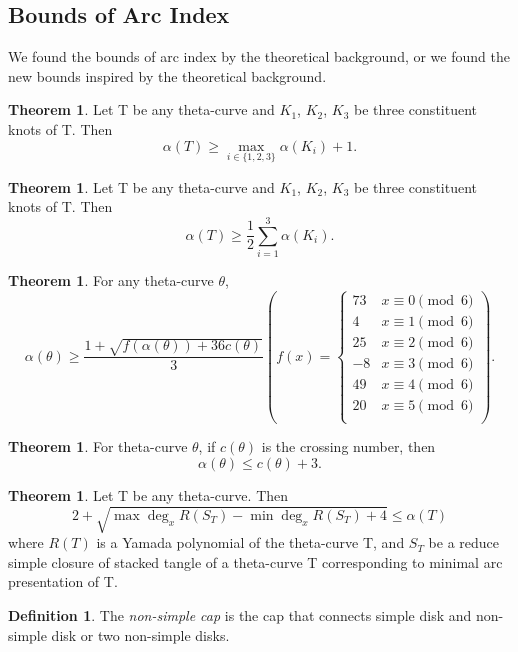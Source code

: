 \documentclass{article}
\theoremstyle{definition}
\newtheorem{defn}[thm]{Definition}
\theoremstyle{theorem}
\newtheorem{theorem}[thm]{Theorem}
\theoremstyle{proposition}
\theoremstyle{corollary}
\begin{document}
\subsection{Bounds of Arc Index}
We found the bounds of arc index by the theoretical background, or we found the new bounds inspired by the theoretical background.


\begin{theorem}
Let T be any theta-curve and $K_1$, $K_2$, $K_3$ be three constituent knots of T. Then $$\alpha(T) \geq \underset{i \in \{1,2,3\}}\max \alpha(K_i) + 1.$$
\end{theorem}

\begin{theorem}
Let T be any theta-curve and $K_1$, $K_2$, $K_3$ be three constituent knots of T. Then $$\alpha(T) \geq \frac{1}{2}\sum_{i=1}^3\alpha(K_i).$$
\end{theorem}

\begin{theorem}
For any theta-curve $\theta$, $$\alpha(\theta)\geq\frac{1+\sqrt{f(\alpha(\theta))+36c(\theta)}}{3} \left(f(x) = \begin{cases} 
		73 & x \equiv 0 \pmod 6\\ 
		4 & x \equiv 1 \pmod 6\\ 
		25 & x \equiv 2 \pmod 6\\ 
		-8 & x \equiv 3 \pmod 6\\ 
		49 & x \equiv 4 \pmod 6\\ 
		20 & x \equiv 5 \pmod 6\\ 
     \end{cases} \right).$$
\end{theorem}

\begin{theorem}
For theta-curve $\theta$, if $c(\theta)$ is the crossing number, then $$\alpha(\theta) \leq c(\theta) + 3.$$
\end{theorem}

\begin{theorem}
Let T be any theta-curve. Then $$2+\sqrt{\max\deg_x R(S_T) - \min\deg_x R(S_T) + 4} \leq \alpha(T)$$ where $R(T)$ is a Yamada polynomial of the theta-curve T, and $S_{T}$ be a reduce simple closure of stacked tangle of a theta-curve T corresponding to minimal arc presentation of T.
\end{theorem}
\begin{defn}
    The \textit{non-simple cap} is the cap that connects simple disk and non-simple disk or two non-simple disks.
\end{defn}
\end{document}
